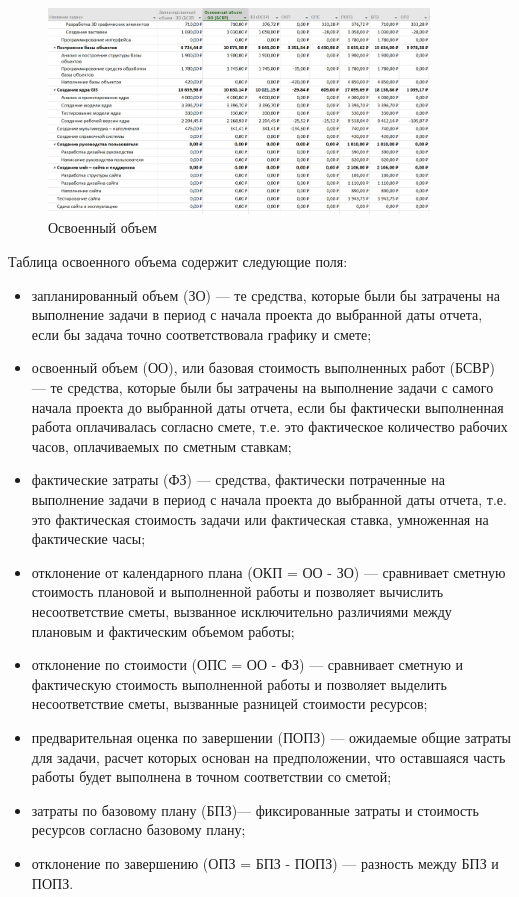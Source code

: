 \begin{figure}[H]
	\centering
	\includegraphics[width=0.9\textwidth]{img/lab5/screen2_2.jpg}
	\caption{Освоенный объем}
	\label{fig:5_screen5}
\end{figure}

Таблица освоенного объема содержит следующие поля:
\begin{itemize}
	\item запланированный объем (ЗО) --- те средства, которые были бы затрачены на выполнение задачи в период с начала проекта до выбранной даты отчета, если бы задача точно соответствовала графику и смете;
	\item освоенный объем (ОО), или базовая стоимость выполненных работ (БСВР) --- те средства, которые были бы затрачены на выполнение задачи с самого начала проекта до выбранной даты отчета, если бы фактически выполненная работа оплачивалась согласно смете, т.е. это фактическое количество рабочих часов, оплачиваемых по сметным ставкам;
	\item фактические затраты (ФЗ) --- средства, фактически потраченные на выполнение задачи в период с начала
	проекта до выбранной даты отчета, т.е. это фактическая стоимость задачи или фактическая ставка, умноженная на фактические часы;
	\item отклонение от календарного плана (ОКП = ОО - ЗО) --- сравнивает сметную стоимость плановой и выполненной работы и позволяет вычислить несоответствие сметы, вызванное исключительно различиями между плановым и фактическим объемом работы;
	\item отклонение по стоимости (ОПС = ОО - ФЗ) --- сравнивает сметную и фактическую стоимость выполненной работы и позволяет выделить несоответствие сметы, вызванные разницей стоимости ресурсов;
	\item предварительная оценка по завершении (ПОПЗ) --- ожидаемые общие затраты для задачи, расчет которых основан на предположении, что оставшаяся часть работы будет выполнена в точном соответствии со сметой;
	\item затраты по базовому плану (БПЗ)--- фиксированные затраты и стоимость ресурсов согласно базовому плану;
	\item отклонение по завершению (ОПЗ = БПЗ - ПОПЗ) --- разность между БПЗ и ПОПЗ.
\end{itemize}

